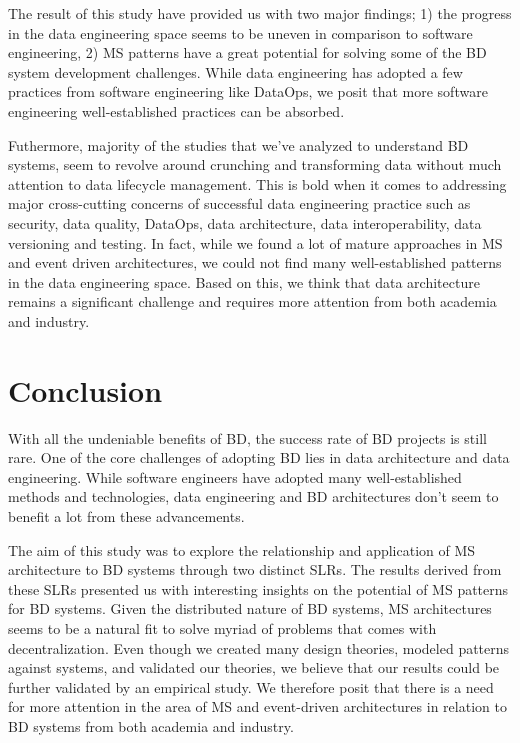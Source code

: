 \documentclass{bmcart}
\begin{document}
The result of this study have provided us with two major findings; 1) the progress in the data engineering space seems to be uneven in comparison to software engineering, 2) MS patterns have a great potential for solving some of the BD system development challenges. While data engineering has adopted a few practices from software engineering like DataOps, we posit that more software engineering well-established practices can be absorbed. 

Futhermore, majority of the studies that we've analyzed to understand BD systems, seem to revolve around crunching and transforming data without much attention to data lifecycle management. This is bold when it comes to addressing major cross-cutting concerns of successful data engineering practice such as security, data quality, DataOps, data architecture, data interoperability, data versioning and testing. In fact, while we found a lot of mature approaches in MS and event driven architectures, we could not find many well-established patterns in the data engineering space. Based on this, we think that data architecture remains a significant challenge and requires more attention from both academia and industry. 



 
\section{Conclusion}
With all the undeniable benefits of BD, the success rate of BD projects is still rare. One of the core challenges of adopting BD lies in data architecture and data engineering. While software engineers have adopted many well-established methods and technologies, data engineering and BD architectures don't seem to benefit a lot from these advancements. 

The aim of this study was to explore the relationship and application of MS architecture to BD systems through two distinct SLRs. The results derived from these SLRs presented us with interesting insights on the potential of MS patterns for BD systems. Given the distributed nature of BD systems, MS architectures seems to be a natural fit to solve myriad of problems that comes with decentralization. Even though we created many design theories, modeled patterns against systems, and validated our theories, we believe that our results could be further validated by an empirical study. We therefore posit that there is a need for more attention in the area of MS and event-driven architectures in relation to BD systems from both academia and industry. 
\end{document}
